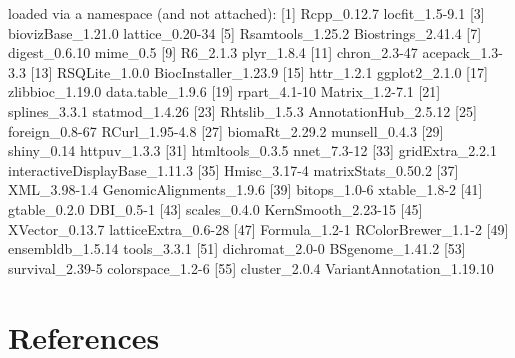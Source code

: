 \documentclass[12pt]{report}
\renewenvironment{Schunk}{\vspace{0pt}}{\vspace{0pt}}
\begin{document}
\begin{Schunk}
\begin{Soutput}
loaded via a namespace (and not attached):
 [1] Rcpp_0.12.7                   locfit_1.5-9.1               
 [3] biovizBase_1.21.0             lattice_0.20-34              
 [5] Rsamtools_1.25.2              Biostrings_2.41.4            
 [7] digest_0.6.10                 mime_0.5                     
 [9] R6_2.1.3                      plyr_1.8.4                   
[11] chron_2.3-47                  acepack_1.3-3.3              
[13] RSQLite_1.0.0                 BiocInstaller_1.23.9         
[15] httr_1.2.1                    ggplot2_2.1.0                
[17] zlibbioc_1.19.0               data.table_1.9.6             
[19] rpart_4.1-10                  Matrix_1.2-7.1               
[21] splines_3.3.1                 statmod_1.4.26               
[23] Rhtslib_1.5.3                 AnnotationHub_2.5.12         
[25] foreign_0.8-67                RCurl_1.95-4.8               
[27] biomaRt_2.29.2                munsell_0.4.3                
[29] shiny_0.14                    httpuv_1.3.3                 
[31] htmltools_0.3.5               nnet_7.3-12                  
[33] gridExtra_2.2.1               interactiveDisplayBase_1.11.3
[35] Hmisc_3.17-4                  matrixStats_0.50.2           
[37] XML_3.98-1.4                  GenomicAlignments_1.9.6      
[39] bitops_1.0-6                  xtable_1.8-2                 
[41] gtable_0.2.0                  DBI_0.5-1                    
[43] scales_0.4.0                  KernSmooth_2.23-15           
[45] XVector_0.13.7                latticeExtra_0.6-28          
[47] Formula_1.2-1                 RColorBrewer_1.1-2           
[49] ensembldb_1.5.14              tools_3.3.1                  
[51] dichromat_2.0-0               BSgenome_1.41.2              
[53] survival_2.39-5               colorspace_1.2-6             
[55] cluster_2.0.4                 VariantAnnotation_1.19.10    
\end{Soutput}
\end{Schunk}

\section{References}



\end{document}
